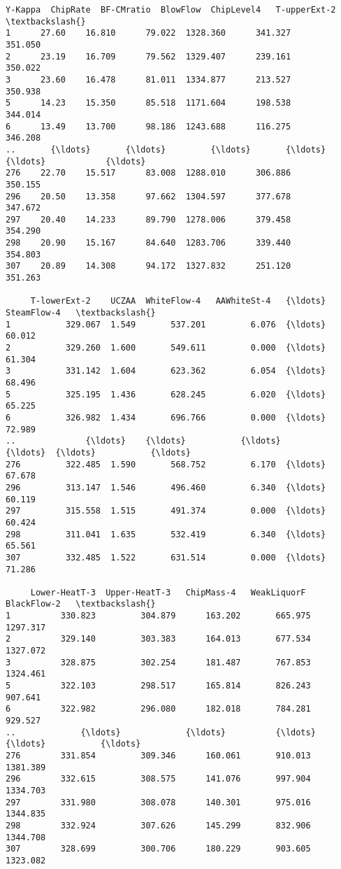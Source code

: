 \documentclass[11pt]{article}
\makeatletter
\newcommand{\boxspacing}{\kern\kvtcb@left@rule\kern\kvtcb@boxsep}
\newcommand{\prompt}[4]{
        {\ttfamily\llap{{\color{#2}[#3]:\hspace{3pt}#4}}\vspace{-\baselineskip}}
    }
\makeatother
\begin{document}
            \begin{tcolorbox}[breakable, size=fbox, boxrule=.5pt, pad at break*=1mm, opacityfill=0]
\prompt{Out}{outcolor}{21}{\boxspacing}
\begin{Verbatim}[commandchars=\\\{\}]
     Y-Kappa  ChipRate  BF-CMratio  BlowFlow  ChipLevel4   T-upperExt-2   \textbackslash{}
1      27.60    16.810      79.022  1328.360      341.327        351.050
2      23.19    16.709      79.562  1329.407      239.161        350.022
3      23.60    16.478      81.011  1334.877      213.527        350.938
5      14.23    15.350      85.518  1171.604      198.538        344.014
6      13.49    13.700      98.186  1243.688      116.275        346.208
..       {\ldots}       {\ldots}         {\ldots}       {\ldots}          {\ldots}            {\ldots}
276    22.70    15.517      83.008  1288.010      306.886        350.155
296    20.50    13.358      97.662  1304.597      377.678        347.672
297    20.40    14.233      89.790  1278.006      379.458        354.290
298    20.90    15.167      84.640  1283.706      339.440        354.803
307    20.89    14.308      94.172  1327.832      251.120        351.263

     T-lowerExt-2    UCZAA  WhiteFlow-4   AAWhiteSt-4   {\ldots}  SteamFlow-4   \textbackslash{}
1           329.067  1.549       537.201         6.076  {\ldots}        60.012
2           329.260  1.600       549.611         0.000  {\ldots}        61.304
3           331.142  1.604       623.362         6.054  {\ldots}        68.496
5           325.195  1.436       628.245         6.020  {\ldots}        65.225
6           326.982  1.434       696.766         0.000  {\ldots}        72.989
..              {\ldots}    {\ldots}           {\ldots}           {\ldots}  {\ldots}           {\ldots}
276         322.485  1.590       568.752         6.170  {\ldots}        67.678
296         313.147  1.546       496.460         6.340  {\ldots}        60.119
297         315.558  1.515       491.374         0.000  {\ldots}        60.424
298         311.041  1.635       532.419         6.340  {\ldots}        65.561
307         332.485  1.522       631.514         0.000  {\ldots}        71.286

     Lower-HeatT-3  Upper-HeatT-3   ChipMass-4   WeakLiquorF   BlackFlow-2   \textbackslash{}
1          330.823         304.879      163.202       665.975      1297.317
2          329.140         303.383      164.013       677.534      1327.072
3          328.875         302.254      181.487       767.853      1324.461
5          322.103         298.517      165.814       826.243       907.641
6          322.982         296.080      182.018       784.281       929.527
..             {\ldots}             {\ldots}          {\ldots}           {\ldots}           {\ldots}
276        331.854         309.346      160.061       910.013      1381.389
296        332.615         308.575      141.076       997.904      1334.703
297        331.980         308.078      140.301       975.016      1344.835
298        332.924         307.626      145.299       832.906      1344.708
307        328.699         300.706      180.229       903.605      1323.082


\end{Verbatim}
\end{tcolorbox}
\end{document}
